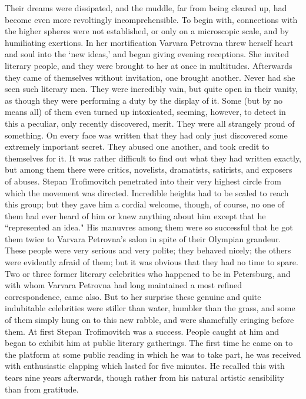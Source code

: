 \documentclass[12pt]{article}
\begin{document}
\vspace{12pt}
Their dreams were dissipated, and the muddle, far from being cleared
up, had become even more revoltingly incomprehensible. To begin with,
connections with the higher spheres were not established, or only on a
microscopic scale, and by humiliating exertions. In her mortification
Varvara Petrovna threw herself heart and soul into the `new ideas,' and
began giving evening receptions. She invited literary people, and they
were brought to her at once in multitudes. Afterwards they came of
themselves without invitation, one brought another. Never had she seen
such literary men. They were incredibly vain, but quite open in their
vanity, as though they were performing a duty by the display of it.
Some (but by no means all) of them even turned up intoxicated, seeming,
however, to detect in this a peculiar, only recently discovered, merit.
They were all strangely proud of something. On every face was written
that they had only just discovered some extremely important secret. They
abused one another, and took credit to themselves for it. It was rather
difficult to find out what they had written exactly, but among them
there were critics, novelists, dramatists, satirists, and exposers of
abuses. Stepan Trofimovitch penetrated into their very highest circle
from which the movement was directed. Incredible heights had to be
scaled to reach this group; but they gave him a cordial welcome, though,
of course, no one of them had ever heard of him or knew anything about
him except that he ``represented an idea." His manuvres among them
were so successful that he got them twice to Varvara Petrovna's salon
in spite of their Olympian grandeur. These people were very serious and
very polite; they behaved nicely; the others were evidently afraid of
them; but it was obvious that they had no time to spare. Two or three
former literary celebrities who happened to be in Petersburg, and with
whom Varvara Petrovna had long maintained a most refined correspondence,
came also. But to her surprise these genuine and quite indubitable
celebrities were stiller than water, humbler than the grass, and some
of them simply hung on to this new rabble, and were shamefully cringing
before them. At first Stepan Trofimovitch was a success. People caught
at him and began to exhibit him at public literary gatherings. The first
time he came on to the platform at some public reading in which he was
to take part, he was received with enthusiastic clapping which lasted
for five minutes. He recalled this with tears nine years afterwards,
though rather from his natural artistic sensibility than from gratitude.
\end{document}
